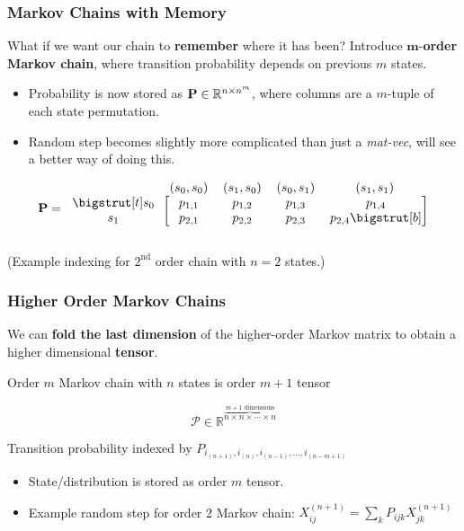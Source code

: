 \documentclass{beamer}
\begin{document}
\begin{frame}
\frametitle{Markov Chains with Memory}
What if we want our chain to \textbf{remember} where it has been?  Introduce $\boldsymbol{m}$-\textbf{order Markov chain}, where transition probability depends on previous $m$ states.

\begin{itemize}
\item Probability is now stored as ${\bf P} \in \mathbb{R}^{n \times n^m}$, where columns are a $m$-tuple of each state permutation.
\item Random step becomes slightly more complicated than just a \textit{mat-vec}, will see a better way of doing this.
\end{itemize}

\begin{block}{}

\[
{\bf P} =
\begin{blockarray}{ccccc}
& \left(s_0, s_0\right) & \left(s_1 , s_0\right) & \left(s_0, s_1\right) & \left(s_1, s_1\right) \\
 \begin{block}{c[cccc]}
	\bigstrut[t]
	s_0 & p_{1,1} & p_{1,2} & p_{1,3} & p_{1,4} \\
	s_1 & p_{2,1} & p_{2,2} & p_{2,3} & p_{2,4}
	\bigstrut[b] \\
 \end{block}
\end{blockarray}
\]

\centering
\begin{tiny}
(Example indexing for $2^{\text{nd}}$ order chain with $n=2$ states.)
\end{tiny}

\end{block}

\end{frame}

\begin{frame}
\frametitle{Higher Order Markov Chains}

We can \textbf{fold the last dimension} of the higher-order Markov matrix to obtain a higher dimensional \textbf{tensor}.

\begin{block}{}
Order $m$ Markov chain with $n$ states is order $m+1$ tensor

\[\mathcal{P} \in \mathbb{R}^{\overbrace{n\times n\times \cdots \times n}^{m+1\text{ dimensions}}}\]

Transition probability indexed by $P_{i_{(n+1)},i_{(n)},i_{(n-1)},\ldots,i_{(n-m+1)}}$
\end{block}

\begin{itemize}
\item State/distribution is stored as order $m$ tensor.
\item Example random step for order 2 Markov chain: $X^{(n+1)}_{ij} = \sum_k P_{ijk} X^{(n+1)}_{jk}$
\end{itemize}

\end{frame}
\end{document}
